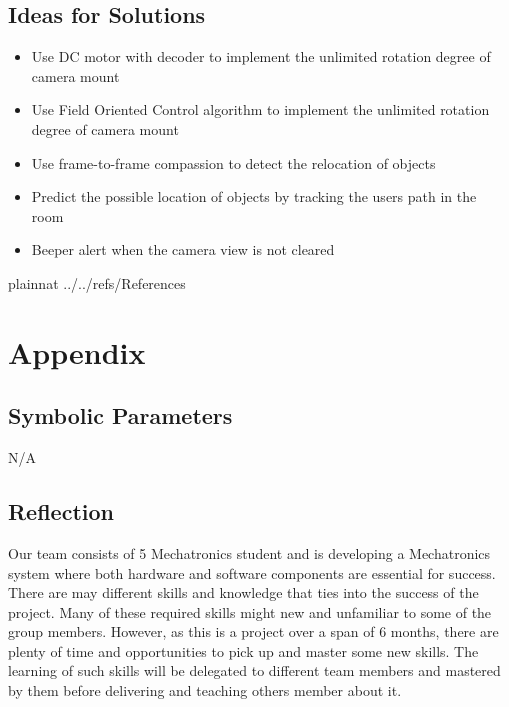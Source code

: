 \documentclass[12pt]{article}
\begin{document}
\subsection{Ideas for Solutions}
\begin{itemize}
    \item Use DC motor with decoder to implement the unlimited rotation degree of camera mount
    \item Use Field Oriented Control algorithm to implement the unlimited rotation degree of camera mount
    \item Use frame-to-frame compassion to detect the relocation of objects
    \item Predict the possible location of objects by tracking the users path in the room
    \item Beeper alert when the camera view is not cleared
\end{itemize}




\newpage

 {plainnat}
 {../../refs/References}

\newpage

\section{Appendix}


\subsection{Symbolic Parameters}

N/A

\subsection{Reflection}

Our team consists of 5 Mechatronics student and is developing a Mechatronics system where both hardware and software components are essential for success. There are may different skills and knowledge that ties into the success of the project. Many of these required skills might new and unfamiliar to some of the group members. However, as this is a project over a span of 6 months, there are plenty of time and opportunities to pick up and master some new skills. The learning of such skills will be delegated to different team members and mastered by them before delivering and teaching others member about it.  
\end{document}
